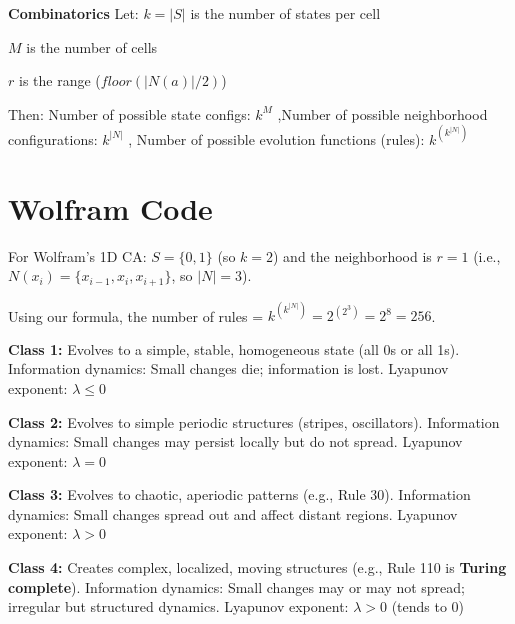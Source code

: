 \textbf{Combinatorics}
Let:
$k = |S|$ is the number of states per cell

$M$ is the number of cells

$r$ is the range ($floor(|N(a)|/2)$)

Then:
Number of possible state configs: $k^{M}$
,Number of possible neighborhood configurations: $k^{|N|}$
, Number of possible evolution functions (rules): $k^{\left(k^{|N|}\right)}$


\section*{Wolfram Code}

For Wolfram's 1D CA: $S = \{0, 1\}$ (so $k=2$) and the neighborhood is $r=1$ (i.e., $N(x_i) = \{x_{i-1}, x_i, x_{i+1}\}$, so $|N|=3$).

Using our formula, the number of rules = $k^{\left(k^{|N|}\right)} = 2^{\left(2^3\right)} = 2^8 = 256$.

\begin{tightitemize}
  \item \textbf{Class 1:} Evolves to a simple, stable, homogeneous state (all 0s or all 1s).  
        Information dynamics: Small changes die; information is lost.  
        Lyapunov exponent: $\lambda \le 0$
  
  \item \textbf{Class 2:} Evolves to simple periodic structures (stripes, oscillators).  
        Information dynamics: Small changes may persist locally but do not spread.  
        Lyapunov exponent: $\lambda = 0$
  
  \item \textbf{Class 3:} Evolves to chaotic, aperiodic patterns (e.g., Rule 30).  
        Information dynamics: Small changes spread out and affect distant regions.  
        Lyapunov exponent: $\lambda > 0$
  
  \item \textbf{Class 4:} Creates complex, localized, moving structures (e.g., Rule 110 is \textbf{Turing complete}).  
        Information dynamics: Small changes may or may not spread; irregular but structured dynamics.  
        Lyapunov exponent: $\lambda > 0$ (tends to 0)
\end{tightitemize}
